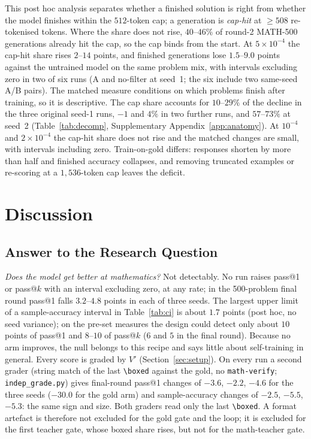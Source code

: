 \documentclass[runningheads]{llncs}
\begin{document}
This post hoc analysis separates whether a finished solution is right from
whether the model finishes within the $512$-token cap; a generation is
\emph{cap-hit} at $\ge508$ re-tokenised tokens. Where the share does not rise,
$40$--$46\%$ of round-2 MATH-500 generations already hit the cap, so the cap
binds from the start. At
$5\times10^{-4}$ the cap-hit share rises $2$--$14$ points, and finished
generations lose $1.5$--$9.0$ points against the untrained model on the same
problem mix, with intervals excluding zero in two of six runs (A and no-filter at
seed~1; the six include two same-seed A/B pairs). The matched measure conditions
on which problems finish after training, so it is descriptive. The cap share
accounts for $10$--$29\%$ of the decline in the three original seed-1 runs, $-1$
and $4\%$ in two further runs, and $57$--$73\%$ at seed~2
(Table~\ref{tab:decomp}, Supplementary Appendix~\ref{app:anatomy}). At $10^{-4}$
and $2\times10^{-4}$ the cap-hit share does not rise and the matched changes are
small, with intervals including zero. Train-on-gold differs: responses shorten by more than half and finished
accuracy collapses, and removing truncated examples or re-scoring at a
$1{,}536$-token cap leaves the deficit.

\section{Discussion}
\label{sec:discussion}

\subsection{Answer to the Research Question}
\label{sec:answer}

\emph{Does the model get better at mathematics?} Not detectably. No run raises
pass@1 or pass@$k$ with an interval excluding zero, at any rate; in the
500-problem final round pass@1 falls $3.2$--$4.8$ points in each of three seeds. The largest upper limit of a sample-accuracy interval in Table~\ref{tab:ci} is about $1.7$ points (post hoc, no seed variance); on the pre-set measures the design could detect only about $10$ points of pass@1 and
$8$--$10$ of pass@$k$ ($6$ and $5$ in the final round). Because no arm improves, the null belongs to this recipe and says little about self-training in general. Every score is graded by $V'$ (Section~\ref{sec:setup}). On every run a
second grader (string match of the last \verb|\boxed| against the gold, no \texttt{math-verify};
\texttt{indep\_grade.py}) gives final-round pass@1 changes of $-3.6$, $-2.2$, $-4.6$ for the three seeds ($-30.0$ for the gold arm) and
sample-accuracy changes of $-2.5$, $-5.5$, $-5.3$: the same sign and size. Both graders read only the last \verb|\boxed|. A format artefact is therefore not excluded for the gold gate and the loop; it is excluded for the first teacher gate, whose boxed share rises, but not for the math-teacher gate.
\end{document}
